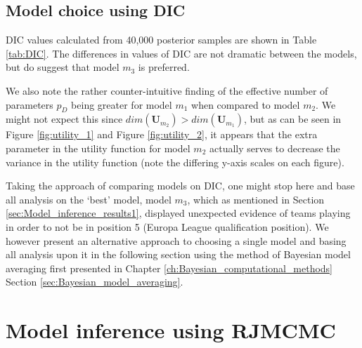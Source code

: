 \subsection{Model choice using DIC}
\label{sec:Model_choice_using_DIC}

\gls{DIC} values calculated from 40,000 posterior samples are shown in Table \ref{tab:DIC}. The differences in values
of \gls{DIC} are not dramatic between the models, but do suggest that model \(m_3\) is preferred.
\begin{table}
\centering
{}
\caption{\label{tab:DIC} \(p_D\) and DIC for the four competing models}
\end{table}

We also note the rather counter-intuitive finding of the effective number of parameters \(p_D\) being greater for model
\(m_1\) when compared to model \(m_2\). We might not expect this since \(dim(\mathbf{U}_{m_2}) >
dim(\mathbf{U}_{m_1})\), but as can be seen in Figure \ref{fig:utility_1} and Figure \ref{fig:utility_2}, it appears
that the extra parameter in the utility function for model \(m_2\) actually serves to decrease the variance in the
utility function (note the differing y-axis scales on each figure).

Taking the approach of comparing models on \gls{DIC}, one might stop here and base all analysis on the `best' model,
model \(m_3\), which as mentioned in Section \ref{sec:Model_inference_results1}, displayed unexpected evidence of teams
playing in order to not be in position 5 (Europa League qualification position). We however present an alternative
approach to choosing a single model and basing all analysis upon it in the following section using the method of
Bayesian model averaging first presented in Chapter \ref{ch:Bayesian_computational_methods} Section
\ref{sec:Bayesian_model_averaging}.

\section{Model inference using RJMCMC}
\label{sec:Model_inference_using_RJMCMC}

